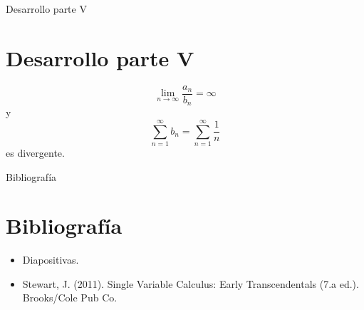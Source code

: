 \documentclass{beamer}
\begin{document}
\begin{frame}{Desarrollo parte V}
    \section{Desarrollo parte V}
    \begin{equation*}
        \lim_{n\rightarrow\infty}\frac{a_n}{b_n} = \infty
    \end{equation*}
    y
    \begin{equation*}
        \sum_{n=1}^{\infty}b_n = \sum_{n=1}^{\infty}\frac{1}{n}
    \end{equation*}
    es divergente.
\end{frame}


\begin{frame}{Bibliografía}
    \section{Bibliografía}
    \begin{itemize}
        \item Diapositivas.
        \item Stewart, J. (2011). Single Variable Calculus: Early Transcendentals (7.a ed.). Brooks/Cole Pub Co.
    \end{itemize}
\end{frame}
\end{document}
